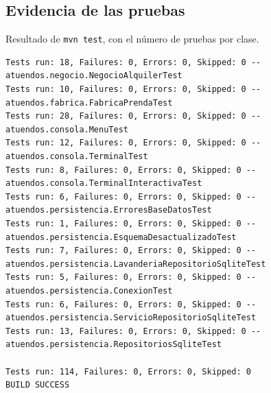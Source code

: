 \subsection{Evidencia de las pruebas}

Resultado de \texttt{mvn test}, con el número de pruebas por clase.

\begin{lstlisting}[numbers=none]
Tests run: 18, Failures: 0, Errors: 0, Skipped: 0 -- atuendos.negocio.NegocioAlquilerTest
Tests run: 10, Failures: 0, Errors: 0, Skipped: 0 -- atuendos.fabrica.FabricaPrendaTest
Tests run: 28, Failures: 0, Errors: 0, Skipped: 0 -- atuendos.consola.MenuTest
Tests run: 12, Failures: 0, Errors: 0, Skipped: 0 -- atuendos.consola.TerminalTest
Tests run: 8, Failures: 0, Errors: 0, Skipped: 0 -- atuendos.consola.TerminalInteractivaTest
Tests run: 6, Failures: 0, Errors: 0, Skipped: 0 -- atuendos.persistencia.ErroresBaseDatosTest
Tests run: 1, Failures: 0, Errors: 0, Skipped: 0 -- atuendos.persistencia.EsquemaDesactualizadoTest
Tests run: 7, Failures: 0, Errors: 0, Skipped: 0 -- atuendos.persistencia.LavanderiaRepositorioSqliteTest
Tests run: 5, Failures: 0, Errors: 0, Skipped: 0 -- atuendos.persistencia.ConexionTest
Tests run: 6, Failures: 0, Errors: 0, Skipped: 0 -- atuendos.persistencia.ServicioRepositorioSqliteTest
Tests run: 13, Failures: 0, Errors: 0, Skipped: 0 -- atuendos.persistencia.RepositoriosSqliteTest

Tests run: 114, Failures: 0, Errors: 0, Skipped: 0
BUILD SUCCESS
\end{lstlisting}
